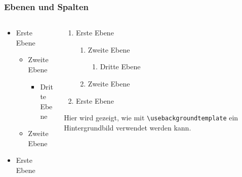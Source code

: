 \documentclass[t,aspectratio=169]{beamer}
\begin{document}
\begin{frame}[fragile]
	\frametitle{Ebenen und Spalten}
	\begin{columns}[T]
		\begin{column}{.47\textwidth}
			\begin{itemize}
				\item Erste Ebene
					\begin{itemize}
						\item Zweite Ebene
						\begin{itemize}
							\item Dritte Ebene
						\end{itemize}
						\item Zweite Ebene
					\end{itemize}
				\item Erste Ebene
			\end{itemize}
		\end{column}		
		\begin{column}{.47\textwidth}
			\begin{enumerate}	
				\item Erste Ebene
					\begin{enumerate}
						\item Zweite Ebene
						\begin{enumerate}
							\item Dritte Ebene
						\end{enumerate}
						\item Zweite Ebene
					\end{enumerate}
				\item Erste Ebene
			\end{enumerate}
			\vspace{0.5cm}
			\begin{block}{}
				Hier wird gezeigt, wie mit \verb|\usebackgroundtemplate| ein Hintergrundbild verwendet werden kann. 
			\end{block}
		\end{column}
	\end{columns}
\end{frame}
\usebackgroundtemplate{}
\end{document}
